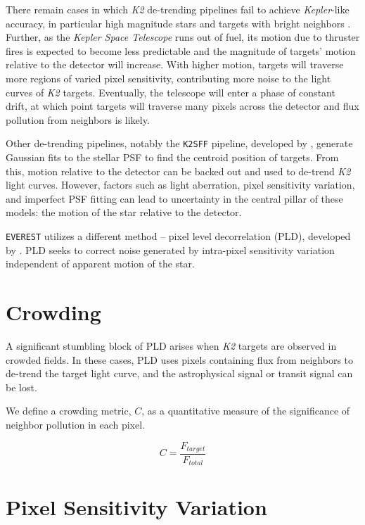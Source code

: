 \documentclass[12pt,preprint]{aastex}
\begin{document}
There remain cases in which \textit{K2} de-trending pipelines fail to achieve \textit{Kepler}-like accuracy, in particular high magnitude stars and targets with bright neighbors \citep{2017arXiv170205488L}. Further, as the \textit{Kepler Space Telescope} runs out of fuel, its motion due to thruster fires is expected to become less predictable and the magnitude of targets' motion relative to the detector will increase. With higher motion, targets will traverse more regions of varied pixel sensitivity, contributing more noise to the light curves of \textit{K2} targets. Eventually, the telescope will enter a phase of constant drift, at which point targets will traverse many pixels across the detector and flux pollution from neighbors is likely. 

Other de-trending pipelines, notably the \texttt{K2SFF} pipeline, developed by \cite{2014PASP..126..948V}, generate Gaussian fits to the stellar PSF to find the centroid position of targets. From this, motion relative to the detector can be backed out and used to de-trend \textit{K2} light curves. However, factors such as light aberration, pixel sensitivity variation, and imperfect PSF fitting can lead to uncertainty in the central pillar of these models: the motion of the star relative to the detector.

\texttt{EVEREST} utilizes a different method -- pixel level decorrelation (PLD), developed by \cite{0004-637X-805-2-132}. PLD seeks to correct noise generated by intra-pixel sensitivity variation independent of apparent motion of the star.

\section{Crowding}

A significant stumbling block of PLD arises when \textit{K2} targets are observed in crowded fields. In these cases, PLD uses pixels containing flux from neighbors to de-trend the target light curve, and the astrophysical signal or transit signal can be lost. 

We define a crowding metric, $C$, as a quantitative measure of the significance of neighbor pollution in each pixel. 

\[
\tag{1}
C = \frac{F_{target}}{F_{total}}
\]

\section{Pixel Sensitivity Variation}
\end{document}
